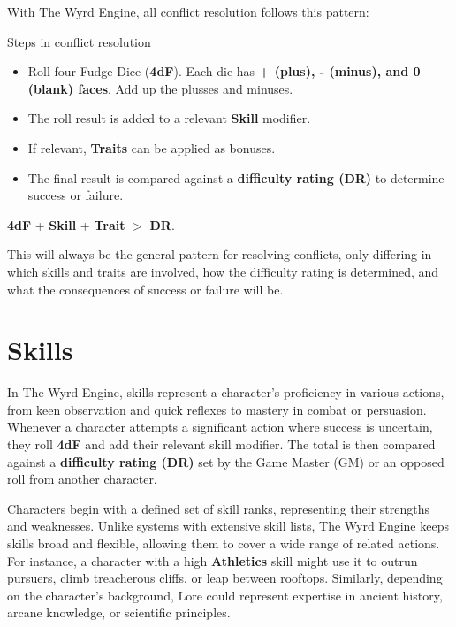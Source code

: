 With The Wyrd Engine, all conflict resolution follows this pattern:

\begin{DndReadAloud}{Steps in conflict resolution}
	\begin{itemize}
		\item Roll four Fudge Dice (\textbf{4dF}).
		      Each die has \textbf{+ (plus), - (minus), and 0 (blank) faces}. Add up the plusses and minuses.
		\item The roll result is added to a relevant \textbf{Skill} modifier.
		\item If relevant, \textbf{Traits} can be applied as bonuses.
		\item The final result is compared against a \textbf{difficulty rating (DR)} to determine success or failure.
	\end{itemize}
	\begin{center}
		\textbf{4dF} + \textbf{Skill} + \textbf{Trait} $>$ \textbf{DR}.	
	\end{center}
\end{DndReadAloud}

This will always be the general pattern for resolving conflicts, only differing in which skills and traits are involved, how the difficulty rating is determined, and what the consequences of success or failure will be.

\section{Skills}

In The Wyrd Engine, skills represent a character’s proficiency in various actions, from keen observation and quick reflexes to mastery in combat or persuasion. Whenever a character attempts a significant action where success is uncertain, they roll \textbf{4dF} and add their relevant skill modifier. The total is then compared against a \textbf{difficulty rating (DR)} set by the Game Master (GM) or an opposed roll from another character.

Characters begin with a defined set of skill ranks, representing their strengths and weaknesses. Unlike systems with extensive skill lists, The Wyrd Engine keeps skills broad and flexible, allowing them to cover a wide range of related actions. For instance, a character with a high \textbf{Athletics} skill might use it to outrun pursuers, climb treacherous cliffs, or leap between rooftops. Similarly, depending on the character's background, Lore could represent expertise in ancient history, arcane knowledge, or scientific principles.

